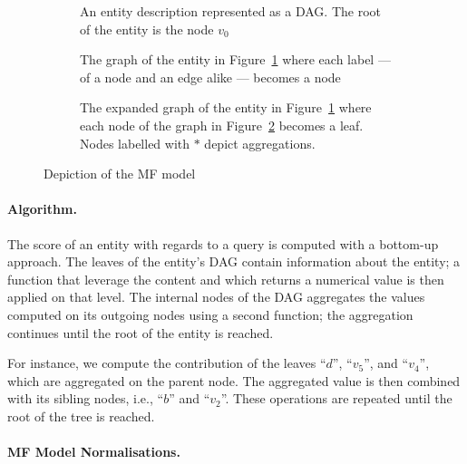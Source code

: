 \begin{figure}
	\centering
	\begin{subfigure}{.3\textwidth}
		\centering
		\resizebox{\textwidth}{!}{
			
		}
		\caption{An entity description represented as a DAG. The root of the entity is the node $v_0$}
		\label{chap6:ranking:fig:concept-tree}
	\end{subfigure}
	\quad
	\begin{subfigure}{.3\textwidth}
		\centering
		\resizebox{\textwidth}{!}{
			
		}
		\caption{The graph of the entity in Figure~\ref{chap6:ranking:fig:concept-tree} where each label --- of a node and an edge alike --- becomes a node}
		\label{chap6:ranking:fig:expanded-graph1}
	\end{subfigure}
	\qquad
	\begin{subfigure}{.7\textwidth}
		\centering
		\resizebox{\textwidth}{!}{
			
		}
		\caption{The expanded graph of the entity in Figure~\ref{chap6:ranking:fig:concept-tree} where each node of the graph in Figure~\ref{chap6:ranking:fig:expanded-graph1} becomes a leaf. Nodes labelled with $*$ depict aggregations.}
		\label{chap6:ranking:fig:expanded-graph2}
	\end{subfigure}
	\caption[Depiction of the MF model]{Depiction of the \gls{MF} model}
\end{figure}

\paragraph{Algorithm.}

The score of an entity with regards to a query is computed with a bottom-up approach. The leaves of the entity's DAG contain information about the entity; a function that leverage the content and which returns a numerical value is then applied on that level. The internal nodes of the DAG aggregates the values computed on its outgoing nodes using a second function; the aggregation continues until the root of the entity is reached.

For instance, we compute the contribution of the leaves ``$d$'', ``$v_5$'', and ``$v_4$'', which are aggregated on the parent node. The aggregated value is then combined with its sibling nodes, i.e., ``$b$'' and ``$v_2$''. These operations are repeated until the root of the tree is reached.

\paragraph{MF Model Normalisations.}
\label{chap6:ranking:mf-model:norm}

